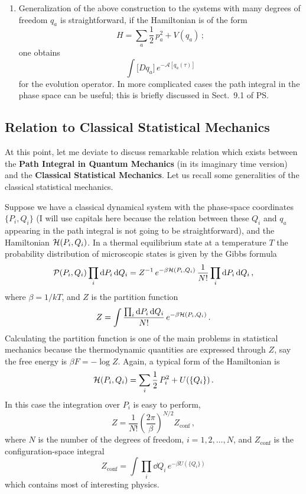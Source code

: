 \begin{enumerate}
\item Generalization of the above construction to the systems with many degrees
of freedom $q_a$ is straightforward, if the Hamiltonian is of the form
\[
H=\sum_a\frac12\,p_a^2+V(q_a)\,;
\]
one obtains
\[
\int\bigl[Dq_a\bigr]\,e^{-\mathcal A[q_a(\tau)]}
\]
for the evolution operator. In more complicated cases the path integral in the
phase space can be useful; this is briefly discussed in Sect.~9.1 of PS.
\end{enumerate}

\subsection*{Relation to Classical Statistical Mechanics}

At this point, let me deviate to discuss remarkable relation which exists
between the \textbf{Path Integral in Quantum Mechanics} (in its imaginary time
version) and the \textbf{Classical Statistical Mechanics}. Let us recall some
generalities of the classical statistical mechanics.

Suppose we have a classical dynamical system with the phase-space coordinates
$\{P_i,Q_i\}$ (I will use capitals here because the relation between these
$Q_i$ and $q_a$ appearing in the path integral is not going to be
straightforward), and the Hamiltonian $\mathcal{H}(P_i,Q_i)$. In a thermal
equilibrium state at a temperature $T$ the probability distribution of
microscopic states is given by the Gibbs formula
\[
\mathcal P(P_i,Q_i)\prod_i \mathop{}\!\mathrm{d} P_i\mathop{}\!\mathrm{d} Q_i=Z^{-1}\,e^{-\beta\mathcal{H}(P_i,Q_i)}\,\frac1{N!}\prod_i \mathop{}\!\mathrm{d} P_i\mathop{}\!\mathrm{d} Q_i\,,
\]
where $\beta=1/kT$, and $Z$ is the partition function
\[
Z=\int\frac{\prod_i \mathop{}\!\mathrm{d} P_i\mathop{}\!\mathrm{d} Q_i}{N!}\,e^{-\beta\mathcal{H}(P_i,Q_i)}\,.
\]
Calculating the partition function is one of the main problems in statistical
mechanics because the thermodynamic quantities are expressed through $Z$, say
the free energy is $\beta F=-\log Z$. Again, a typical form of the Hamiltonian
is
\[
\mathcal{H}(P_i,Q_i)=\sum_i\frac12\,P_i^2+U(\{Q_i\})\,.
\]
In this case the integration over $P_i$ is easy to perform,
\[
Z=\frac1{N!}\left(\frac{2\pi}{\beta}\right)^{N/2}Z_{\text{conf}}\,,
\]
where $N$ is the number of the degrees of freedom, $i=1,2,\dots,N$, and
$Z_{\text{conf}}$ is the configuration-space integral
\[
Z_{\text{conf}}=\int\prod_i \dd Q_i\,e^{-\beta U(\{Q_i\})}
\]
which contains most of interesting physics.

